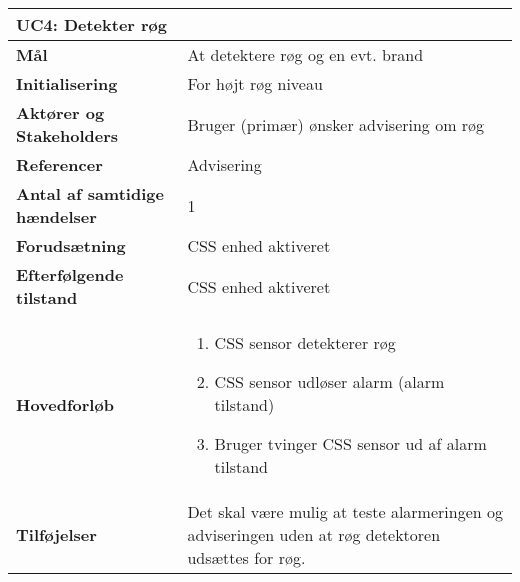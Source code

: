 \begin{table}[H] \centering
\begin{tabular}{|p{6cm}|p{8cm}|}
	\hline
\multicolumn{2}{|l|}{\textbf{UC4: Detekter røg}} \\\hline
\textbf{Mål}								&At detektere røg og en evt. brand \\\hline
\textbf{Initialisering}					&For højt røg niveau\\\hline
\textbf{Aktører og Stakeholders}			&Bruger (primær) ønsker advisering om røg \\\hline
\textbf{Referencer}						&Advisering \\\hline
\textbf{Antal af samtidige hændelser}	&1 \\\hline
\textbf{Forudsætning}					&CSS enhed aktiveret  \\\hline
\textbf{Efterfølgende tilstand}			&CSS enhed aktiveret \\\hline
\textbf{Hovedforløb}						&\begin{enumerate}
\item CSS sensor detekterer røg 

\item CSS sensor udløser alarm (alarm tilstand)

\item Bruger tvinger CSS sensor ud af alarm tilstand

\end{enumerate}\\\hline

\textbf{Tilføjelser}						&Det skal være mulig at teste alarmeringen og adviseringen uden at røg detektoren udsættes for røg.\\\hline
	\end{tabular}
	\label{UC4} 
\end{table}